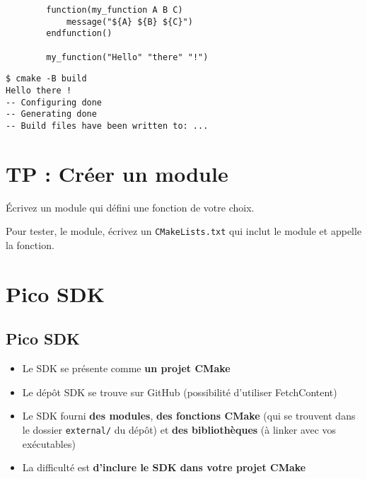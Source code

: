 \documentclass{beamer}
\newenvironment{Frame}{\begin{frame}[containsverbatim]{\subsecname}}{\end{frame}}
\newenvironment{FrameTP}{\begin{frame}[containsverbatim]{\secname}}{\end{frame}}
\begin{document}
\begin{Frame}
    \begin{verbatim}
        function(my_function A B C)
            message("${A} ${B} ${C}")
        endfunction()

        my_function("Hello" "there" "!")
    \end{verbatim}
\end{Frame}

\begin{Frame}
    \begin{verbatim}
$ cmake -B build
Hello there !
-- Configuring done
-- Generating done
-- Build files have been written to: ...
    \end{verbatim}
\end{Frame}

\section{TP : Créer un module}

\begin{FrameTP}
    Écrivez un module qui défini une fonction de votre choix.
    
    Pour tester, le module, écrivez un \verb|CMakeLists.txt| qui inclut le module et appelle la fonction.
\end{FrameTP}

\section{Pico SDK}

\subsection{Pico SDK}

\begin{Frame}
    \begin{itemize}
        \item Le SDK se présente comme \textbf{un projet CMake}
        \item Le dépôt SDK se trouve sur GitHub (possibilité d'utiliser FetchContent)
        \item Le SDK fourni \textbf{des modules}, \textbf{des fonctions CMake} (qui se trouvent dans le dossier \texttt{external/} du dépôt) et \textbf{des bibliothèques} (à linker avec vos exécutables)
        \item La difficulté est \textbf{d'inclure le SDK dans votre projet CMake}
    \end{itemize}
\end{Frame}
\end{document}
